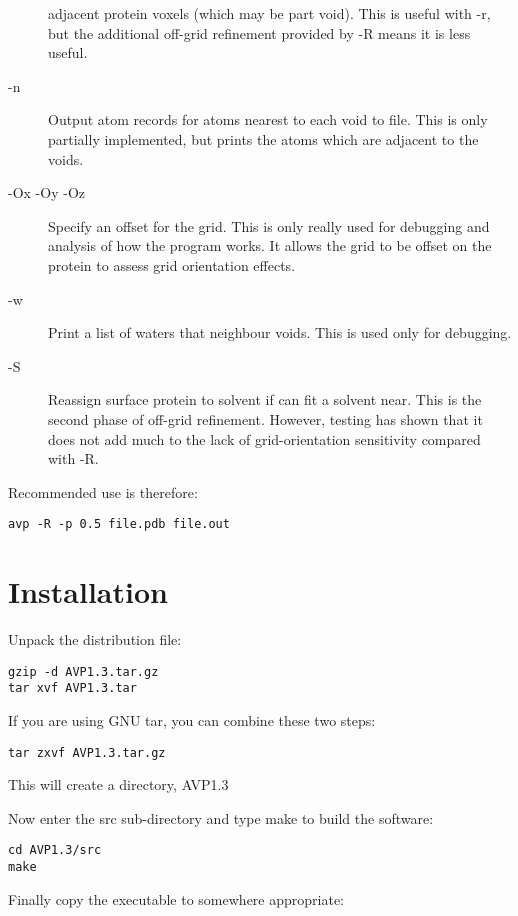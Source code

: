 \documentclass{article}
\begin{document}
\begin{description}
  adjacent protein voxels (which may be part void). This is useful
  with -r, but the additional off-grid refinement provided by -R means
  it is less useful.
\item[-n] Output atom records for atoms nearest to each void to
  file. This is only partially implemented, but prints the atoms which
  are adjacent to the voids.
\item[-Ox -Oy -Oz] Specify an offset for the grid. This is only really
  used for debugging and analysis of how the program works. It allows
  the grid to be offset on the protein to assess grid orientation
  effects. 
\item[-w] Print a list of waters that neighbour voids. This is used
  only for debugging.
\item[-S] Reassign surface protein to solvent if can fit a solvent
  near. This is the second phase of off-grid refinement. However,
  testing has shown that it does not add much to the lack of
  grid-orientation sensitivity compared with -R.
\end{description}

Recommended use is therefore:

\begin{verbatim}
avp -R -p 0.5 file.pdb file.out
\end{verbatim}


\section{Installation}
Unpack the distribution file:

\begin{verbatim}
gzip -d AVP1.3.tar.gz
tar xvf AVP1.3.tar
\end{verbatim}

If you are using GNU tar, you can combine these two steps:

\begin{verbatim}
tar zxvf AVP1.3.tar.gz
\end{verbatim}

This will create a directory, AVP1.3

Now enter the src sub-directory and type make to build the software:

\begin{verbatim}
cd AVP1.3/src
make
\end{verbatim}

Finally copy the executable to somewhere appropriate:
\end{document}
